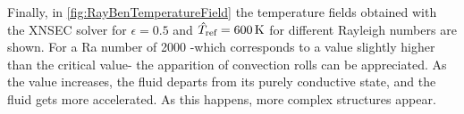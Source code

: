 Finally, in \cref{fig:RayBenTemperatureField} the temperature fields obtained with the XNSEC solver for $\epsilon = 0.5$ and $\hat T_{\text{ref}} = \SI{600}{\kelvin}$ for different Rayleigh numbers are shown. For a Ra number of 2000 -which corresponds to a value slightly higher than the critical value- the apparition of convection rolls can be appreciated. As the value increases, the fluid departs from its purely conductive state, and the fluid gets more accelerated. As this happens, more complex structures appear.
\FloatBarrier
